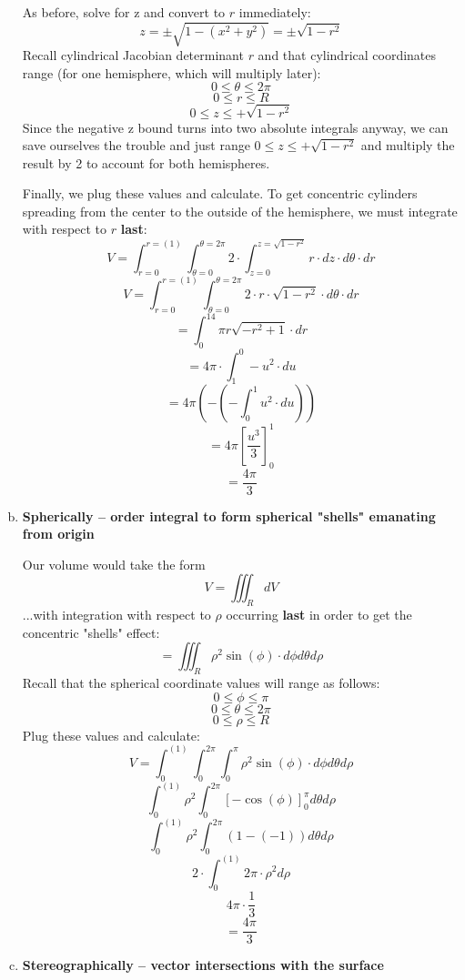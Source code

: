 \documentclass{article}
\begin{document}
\begin{enumerate}[a.]
	    As before, solve for z and convert to $r$ immediately:
	    \[ z=\pm\sqrt{1-(x^2+y^2)} = \pm\sqrt{1-r^2}\]
        Recall cylindrical Jacobian determinant $ r $ and that cylindrical coordinates range (for one hemisphere, which will multiply later):
        \[0 \leq \theta \leq 2\pi \]
        \[0 \leq r \leq R \]
        \[0 \leq z \leq +\sqrt{1-r^2}\]
        Since the negative z bound turns into two absolute integrals anyway, we can save ourselves the trouble and just range $0 \leq z \leq +\sqrt{1-r^2}$ and multiply the result by 2 to account for both hemispheres.

        Finally, we plug these values and calculate. To get concentric cylinders spreading from the center to the outside of the hemisphere, we must integrate with respect to $r$ \textbf{last}:
        \[ V = \int_{r = 0}^{r = (1)} \int_{\theta = 0}^{\theta = 2\pi} 2\cdot\int_{z = 0}^{z = \sqrt{1-r^2}} r \cdot dz \cdot d\theta \cdot dr \]
        \[ V = \int_{r = 0}^{r = (1)} \int_{\theta = 0}^{\theta = 2\pi} 2\cdot r \cdot \sqrt{1-r^2} \cdot d\theta \cdot dr \]
        \[=\int _0^14\pi r\sqrt{-r^2+1} \cdot dr\]
        \[=4\pi \cdot \int _1^0-u^2 \cdot du\]
        \[=4\pi \left(-\left(-\int _0^1u^2 \cdot du\right)\right)\]
        \[=4\pi \left[\frac{u^3}{3}\right]^1_0\]
        \[=\frac{4\pi }{3} \]

	\item \textbf{Spherically -- order integral to form spherical "shells" emanating from origin}

        Our volume would take the form
        \[ V = \iiint_{R}dV \]
        ...with integration with respect to $\rho$ occurring \textbf{last} in order to get the concentric "shells" effect:
        \[ = \iiint_{R}\rho^2\sin(\phi) \cdot d\phi d\theta d\rho \]
        Recall that the spherical coordinate values will range as follows:
        \[ 0 \leq \phi \leq \pi  \]
        \[ 0 \leq \theta \leq 2\pi  \]
        \[ 0 \leq \rho \leq R \]
        Plug these values and calculate:
        \[ V = \int_{0}^{(1)}\int_{0}^{2\pi}\int_{0}^{\pi}\rho^2\sin(\phi) \cdot d\phi d\theta d\rho \]
        \[ \int_{0}^{(1)}\rho^2\int_{0}^{2\pi} \left[-\cos \left(\phi\right)\right]_0^{\pi } d\theta d\rho \]
        \[ \int_{0}^{(1)}\rho^2\int_{0}^{2\pi} (1-\left(-1\right)) d\theta d\rho \]
        \[ 2 \cdot \int_{0}^{(1)} 2\pi \cdot \rho^2 d\rho \]
        \[ 4\pi \cdot \frac{1}{3} \]
        \[ = \frac{4\pi}{3} \]

	\item \textbf{Stereographically -- vector intersections with the surface}
\end{enumerate}
\end{document}
